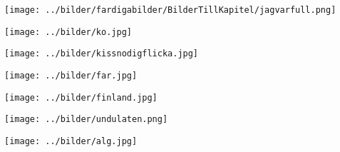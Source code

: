 \begin{intersong}
\sffamily\bfseries\LARGE{}
\begin{center}
\texttt{[image: ../bilder/fardigabilder/BilderTillKapitel/jagvarfull.png]} 
\end{center}
\end{intersong}
\ssclearpage

\begin{intersong}
\begin{center}
\texttt{[image: ../bilder/ko.jpg]} 
\end{center}
\end{intersong}
\ssclearpage


\ssclearpage

\sclearpage
%
\sclearpage

\begin{intersong}
\begin{center}
\texttt{[image: ../bilder/kissnodigflicka.jpg]} 
\end{center}
\end{intersong}
\sclearpage

\begin{intersong}
\begin{center}
\texttt{[image: ../bilder/far.jpg]} 
\end{center}
\end{intersong}
\ssclearpage


\sclearpage

\sclearpage

\ssclearpage

\begin{intersong}
\begin{center}
\texttt{[image: ../bilder/finland.jpg]} 
\end{center}
\end{intersong}
\ssclearpage

\ssclearpage

\ssclearpage

\begin{intersong}
\begin{center}
\texttt{[image: ../bilder/undulaten.png]} 
\end{center}
\end{intersong}
\ssclearpage

\ssclearpage

\ssclearpage



\begin{intersong}
\begin{center}
\texttt{[image: ../bilder/alg.jpg]} 
\end{center}
\end{intersong}
\sclearpage


\sclearpage

\sclearpage

\sclearpage

\sclearpage


%
\sclearpage
